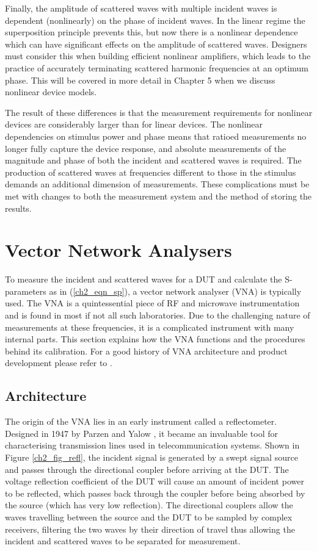 \documentclass[../thesis/thesis.tex]{subfiles}
\begin{document}
Finally, the amplitude of scattered waves with multiple incident waves is dependent (nonlinearly) on the phase of incident waves. In the linear regime the superposition principle prevents this, but now there is a nonlinear dependence which can have significant effects on the amplitude of scattered waves. Designers must consider this when building efficient nonlinear amplifiers, which leads to the practice of accurately terminating scattered harmonic frequencies at an optimum phase. This will be covered in more detail in Chapter 5 when we discuss nonlinear device models. 

The result of these differences is that the measurement requirements for nonlinear devices are considerably larger than for linear devices. The nonlinear dependencies on stimulus power and phase means that ratioed measurements no longer fully capture the device response, and absolute measurements of the magnitude and phase of both the incident and scattered waves is required. The production of scattered waves at frequencies different to those in the stimulus demands an additional dimension of measurements. These complications must be met with changes to both the measurement system and the method of storing the results.

\section{Vector Network Analysers}

To measure the incident and scattered waves for a DUT and calculate the S-parameters as in (\ref{ch2_eqn_sp}), a vector network analyser (VNA) is typically used. The VNA is a quintessential piece of RF and microwave instrumentation and is found in most if not all such laboratories. Due to the challenging nature of measurements at these frequencies, it is a complicated instrument with many internal parts. This section explains how the VNA functions and the procedures behind its calibration. For a good history of VNA architecture and product development please refer to \cite{Teppati_2013,Dunsmore_2012,Rytting_2008}.

\subsection{Architecture}

The origin of the VNA lies in an early instrument called a reflectometer. Designed in 1947 by Parzen and Yalow \cite{Parzen_1947}, it became an invaluable tool for characterising transmission lines used in telecommunication systems. Shown in Figure \ref{ch2_fig_refl}, the incident signal is generated by a swept signal source and passes through the directional coupler before arriving at the DUT. The voltage reflection coefficient of the DUT will cause an amount of incident power to be reflected, which passes back through the coupler before being absorbed by the source (which has very low reflection). The directional couplers allow the waves travelling between the source and the DUT to be sampled by complex receivers, filtering the two waves by their direction of travel thus allowing the incident and scattered waves to be separated for measurement. 
\end{document}
